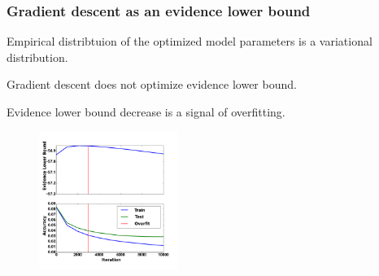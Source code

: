 \documentclass[usenames,dvipsnames,11pt,pdf,utf8,russian,aspectratio=169]{beamer}
\begin{document}
\begin{frame}

\frametitle{Gradient descent as an evidence lower bound}
\footnotesize
Empirical distribtuion of the optimized model parameters is a variational distribution.\\


\begin{multicols}{2}
Gradient descent does not optimize evidence lower bound.
\vspace{-1.cm}
\begin{figure}

\end{figure}

\columnbreak

Evidence lower bound decrease is a signal of overfitting.
\vspace{0.2cm}
\begin{figure}
{\includegraphics[width=0.4\textwidth]{./slide_plots/sgd_show_en.pdf}}
\end{figure}
\end{multicols}
\end{frame}
\end{document}
